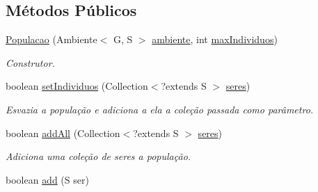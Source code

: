\subsection*{Métodos Públicos}
\begin{DoxyCompactItemize}
\item 
\hyperlink{classic_1_1populacional_1_1_populacao_3_01_g_01extends_01_number_01_6_comparable_3_01_g_01_4_00_506237fa66af7bbd01f529b68d4beaca_ac36f770357cb6c012dce49439b303034}{Populacao} (Ambiente$<$ G, S $>$ \hyperlink{classic_1_1populacional_1_1_populacao_3_01_g_01extends_01_number_01_6_comparable_3_01_g_01_4_00_506237fa66af7bbd01f529b68d4beaca_a12c7cdc6e608deccb84e397ec9dd43dc}{ambiente}, int \hyperlink{classic_1_1populacional_1_1_populacao_3_01_g_01extends_01_number_01_6_comparable_3_01_g_01_4_00_506237fa66af7bbd01f529b68d4beaca_afcdf79ace747a488138db50b05fb21b0}{max\-Individuos})
\begin{DoxyCompactList}\small\item\em Construtor. \end{DoxyCompactList}\item 
boolean \hyperlink{classic_1_1populacional_1_1_populacao_3_01_g_01extends_01_number_01_6_comparable_3_01_g_01_4_00_506237fa66af7bbd01f529b68d4beaca_a1dbf6d55d4479aa588fb085997190cc8}{set\-Individuos} (Collection$<$?extends S $>$ \hyperlink{classic_1_1populacional_1_1_populacao_3_01_g_01extends_01_number_01_6_comparable_3_01_g_01_4_00_506237fa66af7bbd01f529b68d4beaca_a95b7dbe0db4e648740672366ee01877f}{seres})
\begin{DoxyCompactList}\small\item\em Esvazia a população e adiciona a ela a coleção passada como parâmetro. \end{DoxyCompactList}\item 
boolean \hyperlink{classic_1_1populacional_1_1_populacao_3_01_g_01extends_01_number_01_6_comparable_3_01_g_01_4_00_506237fa66af7bbd01f529b68d4beaca_af252d7151066b5cf0b044c63c5ad2a34}{add\-All} (Collection$<$?extends S $>$ \hyperlink{classic_1_1populacional_1_1_populacao_3_01_g_01extends_01_number_01_6_comparable_3_01_g_01_4_00_506237fa66af7bbd01f529b68d4beaca_a95b7dbe0db4e648740672366ee01877f}{seres})
\begin{DoxyCompactList}\small\item\em Adiciona uma coleção de seres a população. \end{DoxyCompactList}\item 
boolean \hyperlink{classic_1_1populacional_1_1_populacao_3_01_g_01extends_01_number_01_6_comparable_3_01_g_01_4_00_506237fa66af7bbd01f529b68d4beaca_af3202776ab8e02e8f0f15a2e7ef3a2bd}{add} (S ser)

\end{DoxyCompactItemize}
